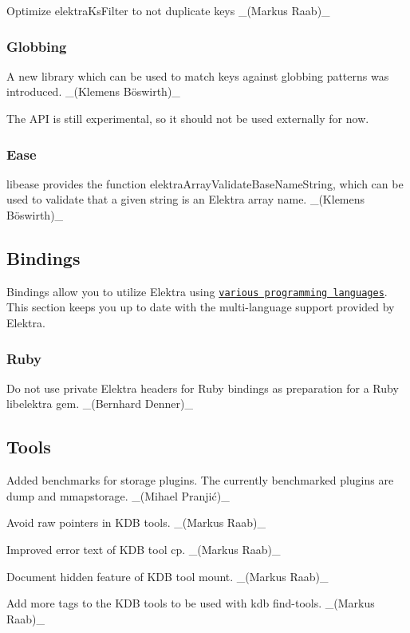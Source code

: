 Optimize elektra\+Ks\+Filter to not duplicate keys \+\_\+(\+Markus Raab)\+\_\+

\subsubsection*{Globbing}

A new library which can be used to match keys against globbing patterns was introduced. \+\_\+(Klemens Böswirth)\+\_\+

The A\+PI is still experimental, so it should not be used externally for now.

\subsubsection*{Ease}

{\ttfamily libease} provides the function {\ttfamily elektra\+Array\+Validate\+Base\+Name\+String}, which can be used to validate that a given string is an Elektra array name. \+\_\+(Klemens Böswirth)\+\_\+

\subsection*{Bindings}

Bindings allow you to utilize Elektra using \href{https://www.libelektra.org/bindings/readme}{\tt various programming languages}. This section keeps you up to date with the multi-\/language support provided by Elektra.

\subsubsection*{Ruby}

Do not use private Elektra headers for Ruby bindings as preparation for a Ruby {\ttfamily libelektra} gem. \+\_\+(\+Bernhard Denner)\+\_\+

\subsection*{Tools}


\begin{DoxyItemize}
\item Added benchmarks for storage plugins. The currently benchmarked plugins are {\ttfamily dump} and {\ttfamily mmapstorage}. \+\_\+(Mihael Pranjić)\+\_\+
\item Avoid raw pointers in K\+DB tools. \+\_\+(\+Markus Raab)\+\_\+
\item Improved error text of K\+DB tool {\ttfamily cp}. \+\_\+(\+Markus Raab)\+\_\+
\item Document hidden feature of K\+DB tool {\ttfamily mount}. \+\_\+(\+Markus Raab)\+\_\+
\item Add more tags to the K\+DB tools to be used with {\ttfamily kdb find-\/tools}. \+\_\+(\+Markus Raab)\+\_\+
\end{DoxyItemize}


